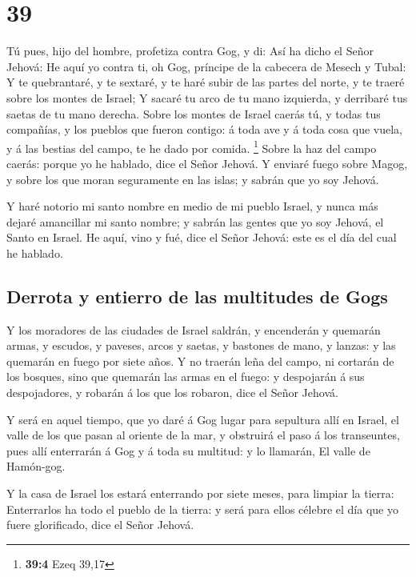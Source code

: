 \hypertarget{section-38}{%
\section{39}\label{section-38}}

 Tú pues, hijo del hombre, profetiza contra Gog, y di: Así
ha dicho el Señor Jehová: He aquí yo contra ti, oh Gog, príncipe de la
cabecera de Mesech y Tubal:  Y te quebrantaré, y te sextaré,
y te haré subir de las partes del norte, y te traeré sobre los montes de
Israel;  Y sacaré tu arco de tu mano izquierda, y derribaré
tus saetas de tu mano derecha.  Sobre los montes de Israel
caerás tú, y todas tus compañías, y los pueblos que fueron contigo: á
toda ave y á toda cosa que vuela, y á las bestias del campo, te he dado
por comida. \footnote{\textbf{39:4} Ezeq 39,17}  Sobre la
haz del campo caerás: porque yo he hablado, dice el Señor Jehová.
 Y enviaré fuego sobre Magog, y sobre los que moran
seguramente en las islas; y sabrán que yo soy Jehová.

 Y haré notorio mi santo nombre en medio de mi pueblo
Israel, y nunca más dejaré amancillar mi santo nombre; y sabrán las
gentes que yo soy Jehová, el Santo en Israel.  He aquí, vino
y fué, dice el Señor Jehová: este es el día del cual he hablado.

\hypertarget{derrota-y-entierro-de-las-multitudes-de-gogs}{%
\subsection{Derrota y entierro de las multitudes de
Gogs}\label{derrota-y-entierro-de-las-multitudes-de-gogs}}

 Y los moradores de las ciudades de Israel saldrán, y
encenderán y quemarán armas, y escudos, y paveses, arcos y saetas, y
bastones de mano, y lanzas: y las quemarán en fuego por siete años.
 Y no traerán leña del campo, ni cortarán de los bosques,
sino que quemarán las armas en el fuego: y despojarán á sus
despojadores, y robarán á los que los robaron, dice el Señor Jehová.

 Y será en aquel tiempo, que yo daré á Gog lugar para
sepultura allí en Israel, el valle de los que pasan al oriente de la
mar, y obstruirá el paso á los transeuntes, pues allí enterrarán á Gog y
á toda su multitud: y lo llamarán, El valle de Hamón-gog.

 Y la casa de Israel los estará enterrando por siete meses,
para limpiar la tierra:  Enterrarlos ha todo el pueblo de
la tierra: y será para ellos célebre el día que yo fuere glorificado,
dice el Señor Jehová.

